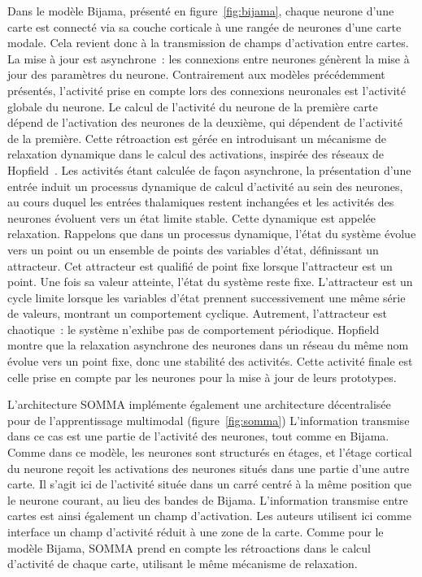 \documentclass[../main]{subfiles}
\begin{document}
Dans le modèle Bijama, présenté en figure~\ref{fig:bijama}, chaque neurone d'une carte est connecté via sa couche corticale à une rangée de neurones d'une carte modale. Cela revient donc à la transmission de champs d'activation entre cartes.
La mise à jour est asynchrone~: les connexions entre neurones génèrent la mise à jour des paramètres du neurone. Contrairement aux modèles précédemment présentés, l'activité prise en compte lors des connexions neuronales est l'activité globale du neurone. Le calcul de l'activité du neurone de la première carte dépend de l'activation des neurones de la deuxième, qui dépendent de l'activité de la première.
Cette rétroaction est gérée en introduisant un mécanisme de relaxation dynamique dans le calcul des activations, inspirée des réseaux de Hopfield~\cite{Hopfield1982NeuralNA}.
Les activités étant calculée de façon asynchrone, la présentation d'une entrée induit un processus dynamique de calcul d'activité au sein des neurones, au cours duquel les entrées thalamiques restent inchangées et les activités des neurones évoluent vers un état limite stable. Cette dynamique est appelée relaxation.
Rappelons que dans un processus dynamique, l'état du système évolue vers un point ou un ensemble de points des variables d'état, définissant un attracteur. Cet attracteur est qualifié de point fixe lorsque l'attracteur est un point. Une fois sa valeur atteinte, l'état du système reste fixe. L'attracteur est un cycle limite lorsque les variables d'état prennent successivement une même série de valeurs, montrant un comportement cyclique. Autrement, l'attracteur est chaotique~: le système n'exhibe pas de comportement périodique.
Hopfield montre que la relaxation asynchrone des neurones dans un réseau du même nom évolue vers un point fixe, donc une stabilité des activités.
Cette activité finale est celle prise en compte par les neurones pour la mise à jour de leurs prototypes.

L'architecture SOMMA implémente également une architecture décentralisée pour de l'apprentissage multimodal (figure~\ref{fig:somma})
L'information transmise dans ce cas est une partie de l'activité des neurones, tout comme en Bijama. Comme dans ce modèle, les neurones sont structurés en étages, et l'étage cortical du neurone reçoit les activations des neurones situés dans une partie d'une autre carte.
Il s'agit ici de l'activité située dans un carré centré à la même position que le neurone courant, au lieu des bandes de Bijama.
L'information transmise entre cartes est ainsi également un champ d'activation. Les auteurs utilisent ici comme interface un champ d'activité réduit à une zone de la carte. Comme pour le modèle Bijama, SOMMA prend en compte les rétroactions dans le calcul d'activité de chaque carte, utilisant le même mécanisme de relaxation.
\end{document}
